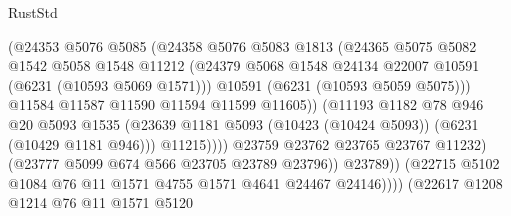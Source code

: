 \begin{lexlean}{RustStd}
\begin{coremodule}
{{                                    (@24353
                                      @5076
                                      @5085
                                      (@24358
                                        @5076
                                        @5083
                                        @1813
                                        (@24365
                                          @5075
                                          @5082
                                          @1542
                                          @5058
                                          @1548
                                          @11212
                                          (@24379
                                            @5068
                                            @1548
                                            @24134
                                            @22007
                                            @10591
                                            (@6231 (@10593 @5069 @1571)))
                                          @10591
                                          (@6231 (@10593 @5059 @5075)))
                                        @11584
                                        @11587
                                        @11590
                                        @11594
                                        @11599
                                        @11605))
                                    (@11193
                                      @1182
                                      @78
                                      @946
                                      @20
                                      @5093
                                      @1535
                                      (@23639
                                        @1181
                                        @5093
                                        (@10423 (@10424 @5093))
                                        (@6231 (@10429 @1181 @946)))
                                      @11215))))
                              @23759
                              @23762
                              @23765
                              @23767
                              @11232)
                            (@23777 @5099 @674 @566 @23705 @23789 @23796))
                          @23789))
                      (@22715 @5102 @1084 @76 @11 @1571 @4755 @1571 @4641 @24467 @24146))))
                (@22617
                  @1208
                  @1214
                  @76
                  @11
                  @1571
                  @5120
}}
\end{coremodule}
\end{lexlean}
